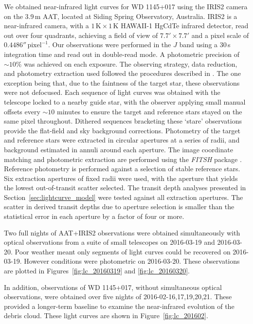 \documentclass[useAMS,usenatbib]{mn2e}
\begin{document}
We obtained near-infrared light curves for WD 1145+017 using the IRIS2 camera \citep{2004SPIE.5492..998T} on the 3.9\,m AAT, located at Siding Spring Observatory, Australia. IRIS2 is a near-infrared camera, with a $1\,\mathrm{K} \times 1\,\mathrm{K}$ HAWAII-1 HgCdTe infrared detector, read out over four quadrants, achieving a field of view of $7.7' \times 7.7 '$ and a pixel scale of $0.4486''\,\mathrm{pixel}^{-1}$. Our observations were performed in the $J$ band using a 30\,s integration time and read out in double-read mode. A photometric precision of $\sim 10\mathrm{\%}$ was achieved on each exposure. The observing strategy, data reduction, and photometry extraction used followed the procedures described in \citet{2014MNRAS.445.2746Z,2015MNRAS.454.3002Z}. The one exception being that, due to the faintness of the target star, these observations were not defocused. Each sequence of light curves was obtained with the telescope locked to a nearby guide star, with the observer applying small manual offsets every $\sim 10$ minutes to ensure the target and reference stars stayed on the same pixel throughout. Dithered sequences bracketing these `stare' observations provide the flat-field and sky background corrections. Photometry of the target and reference stars were extracted in circular apertures at a series of radii, and background estimated in annuli around each aperture. The image coordinate matching and photometric extraction are performed using the \emph{FITSH} package \citep{2012MNRAS.421.1825P}. Reference photometry is performed against a selection of stable reference stars. Six extraction apertures of fixed radii were used, with the aperture that yields the lowest out-of-transit scatter selected. The transit depth analyses presented in Section~\ref{sec:lightcurve_model} were tested against all extraction apertures. The scatter in derived transit depths due to aperture selection is smaller than the statistical error in each aperture by a factor of four or more. 

Two full nights of AAT+IRIS2 observations were obtained simultaneously with optical observations from a suite of small telescopes on 2016-03-19 and 2016-03-20. Poor weather meant only segments of light curves could be recovered on 2016-03-19. However conditions were photometric on 2016-03-20. These observations are plotted in Figures~\ref{fig:lc_20160319} and \ref{fig:lc_20160320}. 

In addition, observations of WD 1145+017, without simultaneous optical observations, were obtained over five nights of 2016-02-16,17,19,20,21. These provided a longer-term baseline to examine the near-infrared evolution of the debris cloud. These light curves are shown in Figure~\ref{fig:lc_201602}.
\end{document}
